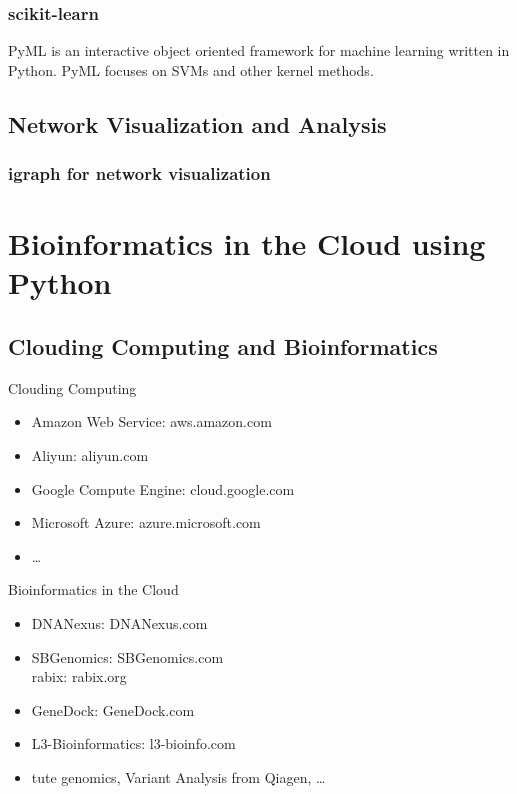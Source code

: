 \documentclass[UTF8]{beamer}
\begin{document}
\begin{frame}
  \frametitle{scikit-learn}
  PyML is an interactive object oriented framework for machine learning written
   in Python. PyML focuses on SVMs and other kernel methods.
\end{frame}

\subsection{Network Visualization and Analysis}
\begin{frame}
  \frametitle{igraph for network visualization}
\end{frame}



\section{Bioinformatics in the Cloud using Python}

\subsection{Clouding Computing and Bioinformatics}

\begin{frame}{Clouding Computing}
  \begin{itemize}
    \item Amazon Web Service: aws.amazon.com
    \item Aliyun: aliyun.com
    \item Google Compute Engine: cloud.google.com
    \item Microsoft Azure: azure.microsoft.com
    \item \ldots
  \end{itemize}
\end{frame}

\begin{frame}{Bioinformatics in the Cloud}
  \begin{itemize}
    \item DNANexus: DNANexus.com
    \item SBGenomics: SBGenomics.com\\
      rabix: rabix.org
    \item GeneDock: GeneDock.com
    \item L3-Bioinformatics: l3-bioinfo.com
    \item tute genomics, Variant Analysis from Qiagen, \ldots
  \end{itemize}
\end{frame}
\end{document}
